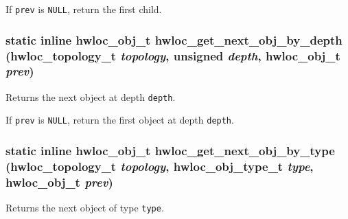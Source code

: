 If {\tt prev} is {\tt NULL}, return the first child. \hypertarget{group__hwlocality__helper__traversal__basic_g5755cecb9124c5181642ac84dc5bc554}{
\subsubsection[{hwloc\_\-get\_\-next\_\-obj\_\-by\_\-depth}]{\setlength{\rightskip}{0pt plus 5cm}static inline {\bf hwloc\_\-obj\_\-t} hwloc\_\-get\_\-next\_\-obj\_\-by\_\-depth ({\bf hwloc\_\-topology\_\-t} {\em topology}, \/  unsigned {\em depth}, \/  {\bf hwloc\_\-obj\_\-t} {\em prev})}}
\label{group__hwlocality__helper__traversal__basic_g5755cecb9124c5181642ac84dc5bc554}


Returns the next object at depth {\tt depth}. 

If {\tt prev} is {\tt NULL}, return the first object at depth {\tt depth}. \hypertarget{group__hwlocality__helper__traversal__basic_gd011fce572551516267de3c57241a326}{
\subsubsection[{hwloc\_\-get\_\-next\_\-obj\_\-by\_\-type}]{\setlength{\rightskip}{0pt plus 5cm}static inline {\bf hwloc\_\-obj\_\-t} hwloc\_\-get\_\-next\_\-obj\_\-by\_\-type ({\bf hwloc\_\-topology\_\-t} {\em topology}, \/  {\bf hwloc\_\-obj\_\-type\_\-t} {\em type}, \/  {\bf hwloc\_\-obj\_\-t} {\em prev})}}
\label{group__hwlocality__helper__traversal__basic_gd011fce572551516267de3c57241a326}


Returns the next object of type {\tt type}. 

